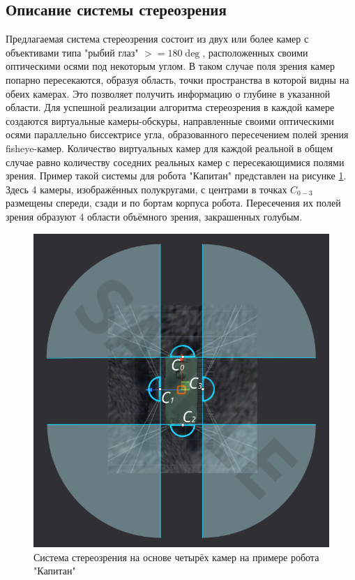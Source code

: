 \subsection{Описание системы стереозрения}

Предлагаемая система стереозрения состоит из двух или более камер с объективами типа "рыбий глаз" $>=180\deg$,
расположенных своими оптическими осями под некоторым углом. В таком случае поля зрения камер попарно пересекаются, 
образуя  область, точки пространства в которой видны на обеих камерах. Это позволяет получить информацию о 
глубине в указанной области.
Для успешной реализации алгоритма стереозрения в каждой камере создаются виртуальные камеры-обскуры, направленные 
своими оптическими осями параллельно биссектрисе угла, образованного пересечением полей зрения fisheye-камер. Количество
 виртуальных камер для каждой реальной в общем случае равно количеству соседних реальных камер с пересекающимися полями 
 зрения. Пример такой системы для робота "Капитан" представлен на рисунке \ref{pic:4cam_system}. Здесь 4 камеры, изображённых
 полукругами, с центрами в точках $C_{0-3}$ размещены спереди, сзади и по бортам корпуса робота. Пересечения их полей зрения 
 образуют 4 области объёмного зрения, закрашенных голубым.    %
 \begin{figure}[H]
    \begin{center}
        \includegraphics[scale=0.5]{pics/sample_4cam.png}                                                               %
        \caption{Система стереозрения на основе четырёх камер на примере робота "Капитан"}
        \label{pic:4cam_system}
    \end{center}
\end{figure}
